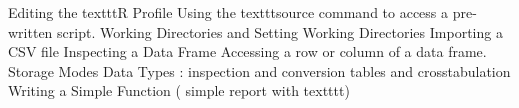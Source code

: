 
Editing the texttt{R} Profile
Using the texttt{source} command to access a pre-written script.
Working Directories and Setting Working Directories
Importing a CSV file
Inspecting a Data Frame
Accessing a row or column of a data frame.
Storage Modes
Data Types : inspection and conversion
tables and crosstabulation
Writing a Simple Function ( simple report with texttt{t})


